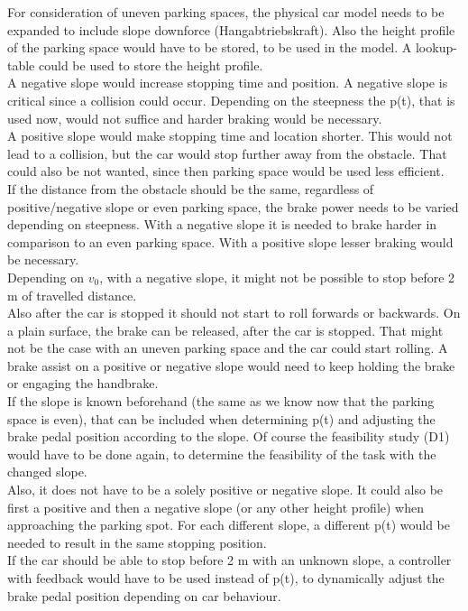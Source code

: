 For consideration of uneven parking spaces, the physical car model needs to be expanded to include slope downforce (Hangabtriebskraft).
Also the height profile of the parking space would have to be stored, to be used in the model.
A lookup-table could be used to store the height profile.\\
A negative slope would increase stopping time and position.
A negative slope is critical since a collision could occur.
Depending on the steepness the p(t), that is used now, would not suffice and harder braking would be necessary.\\
A positive slope would make stopping time and location shorter.
This would not lead to a collision, but the car would stop further away from the obstacle.
That could also be not wanted, since then parking space would be used less efficient.\\
If the distance from the obstacle should be the same, regardless of positive/negative slope or even parking space, the brake power needs to be varied depending on steepness. With a negative slope it is needed to brake harder in comparison to an even parking space. With a positive slope lesser braking would be necessary.\\
Depending on $v_0$, with a negative slope, it might not be possible to stop before 2 m of travelled distance.\\
Also after the car is stopped it should not start to roll forwards or backwards.
On a plain surface, the brake can be released, after the car is stopped.
That might not be the case with an uneven parking space and the car could start rolling.
A brake assist on a positive or negative slope would need to keep holding the brake or engaging the handbrake.\\
If the slope is known beforehand (the same as we know now that the parking space is even), that can be included when determining p(t) and adjusting the brake pedal position according to the slope.
Of course the feasibility study (D1) would have to be done again, to determine the feasibility of the task with the changed slope.\\
Also, it does not have to be a solely positive or negative slope.
It could also be first a positive and then a negative slope (or any other height profile) when approaching the parking spot.
For each different slope, a different p(t) would be needed to result in the same stopping position.\\
If the car should be able to stop before 2 m with an unknown slope, a controller with feedback would have to be used instead of p(t), to dynamically adjust the brake pedal position depending on car behaviour.

